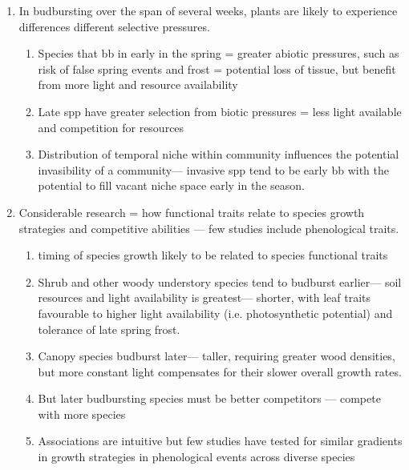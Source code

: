 \documentclass{article}
\begin{document}
\begin{enumerate}
\item In budbursting over the span of several weeks, plants are likely to experience differences different selective pressures.  
\begin{enumerate}
\item Species that bb in early in the spring = greater abiotic pressures, such as risk of false spring events and frost = potential loss of tissue, but benefit from more light and resource availability
\item Late spp have greater selection from biotic pressures = less light available and competition for resources 
\item Distribution of temporal niche within community influences the potential invasibility of a community--- invasive spp tend to be early bb with the potential to fill vacant niche space early in the season. 
\end{enumerate}

\item Considerable research = how functional traits relate to species growth strategies and competitive abilities — few studies include phenological traits.
\begin{enumerate}
\item timing of species growth likely to be related to species functional traits 
\item Shrub and other woody understory species tend to budburst earlier--- soil resources and light availability is greatest--- shorter, with leaf traits favourable to higher light availability (i.e. photosynthetic potential) and tolerance of late spring frost.
\item Canopy species budburst later--- taller, requiring greater wood densities, but more constant light compensates for their slower overall growth rates.
\item But later budbursting species must be better competitors --- compete with more species
\item Associations are intuitive but few studies have tested for similar gradients in growth strategies in phenological events across diverse species
\end{enumerate}


\end{enumerate}
\end{document}
